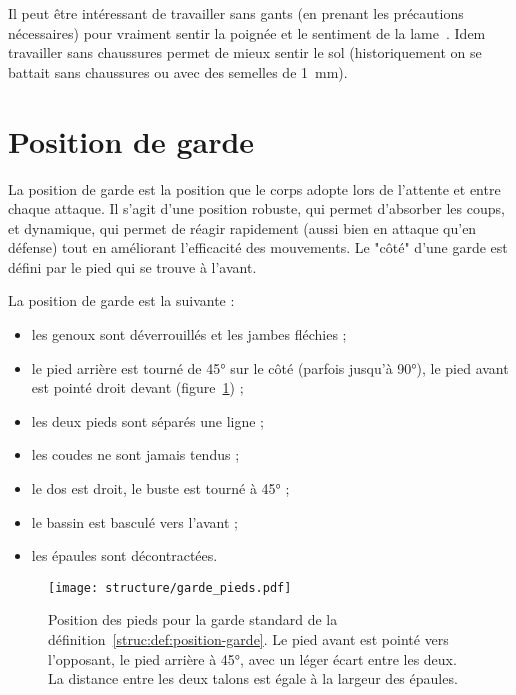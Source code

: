 Il peut être intéressant de travailler sans gants (en prenant les précautions nécessaires) pour vraiment sentir la poignée et le sentiment de la lame~\cite{enzi:dijon:messer_inner:2015}.
Idem travailler sans chaussures permet de mieux sentir le sol (historiquement on se battait sans chaussures ou avec des semelles de \SI{1}{mm}).


\section{Position de garde}


La position de garde est la position que le corps adopte lors de l'attente et entre chaque attaque.
Il s'agit d'une position robuste, qui permet d'absorber les coups, et dynamique, qui permet de réagir rapidement (aussi bien en attaque qu'en défense) tout en améliorant l'efficacité des mouvements.
Le "côté" d'une garde est défini par le pied qui se trouve à l'avant.


\begin{definition}
\label{struc:def:position-garde}

La position de garde est la suivante :
\begin{itemize}
	\item les genoux sont déverrouillés et les jambes fléchies ;
	\item le pied arrière est tourné de \ang{45} sur le côté (parfois jusqu'à 90°), le pied avant est pointé droit devant (figure~\ref{struc:fig:garde-pieds}) ;
	\item les deux pieds sont séparés une ligne ;
	\item les coudes ne sont jamais tendus ;
	\item le dos est droit, le buste est tourné à \ang{45} ;
	\item le bassin est basculé vers l'avant ;
	\item les épaules sont décontractées.
\end{itemize}
\end{definition}


\begin{figure}[ht]
	\centering
	\texttt{[image: structure/garde\_pieds.pdf]}
	\caption{Position des pieds pour la garde standard de la définition~\ref{struc:def:position-garde}.
	Le pied avant est pointé vers l'opposant, le pied arrière à \ang{45}, avec un léger écart entre les deux.
	La distance entre les deux talons est égale à la largeur des épaules.}
	\label{struc:fig:garde-pieds}
\end{figure}


